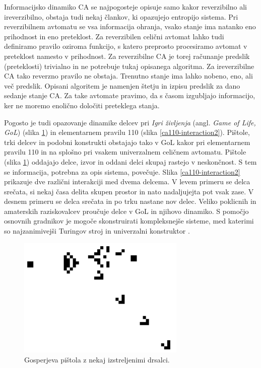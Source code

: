 \documentclass[12pt,a4paper,openany,twoside]{book}
\begin{document}
Informacijsko dinamiko CA se najpogosteje opisuje samo kakor reverzibilno ali ireverzibilno,
obstaja tudi nekaj člankov, ki opazujejo entropijo sistema.
Pri reverzibilnem avtomatu se vsa informacija ohranja, vsako stanje ima natanko eno prihodnost in eno preteklost.
Za reverzibilen celični avtomat lahko tudi definiramo pravilo oziroma funkcijo,
s katero preprosto procesiramo avtomat v preteklost namesto v prihodnost.
Za reverzibilne CA je torej računanje predslik (preteklosti)
trivialno in ne potrebuje tukaj opisanega algoritma.
Za ireverzibilne CA tako reverzno pravilo ne obstaja.
Trenutno stanje ima lahko nobeno, eno, ali več predslik.
Opisani algoritem je namenjen štetju in izpisu predslik za dano sedanje stanje CA.
Za take avtomate pravimo, da s časom izgubljajo informacijo,
ker ne moremo enolično določiti preteklega stanja.

Pogosto je tudi opazovanje dinamike delcev pri \emph{Igri življenja} (angl. \emph{Game of Life, GoL}) \cite{WikiGoL} (slika \ref{gospers_glider_gun})
in elementarnem pravilu 110 \cite{WikiRule110} (slika \ref{ca110-interaction2}).
Pištole, trki delcev in podobni konstrukti obstajajo tako v GoL kakor pri elementarnem pravilu 110
in na splošno pri vsakem univerzalnem celičnem avtomatu.
Pištole (slika \ref{gospers_glider_gun}) oddajajo delce, izvor in oddani delci skupaj rastejo v neskončnost.
S tem se informacija, potrebna za opis sistema, povečuje.
Slika \ref{ca110-interaction2} prikazuje dve različni interakciji med dvema delcema.
V levem primeru se delca srečata, si nekaj časa delita skupen prostor in nato nadaljujejta pot vsak zase.
V desnem primeru se delca srečata in po trku nastane nov delec.
Veliko poklicnih in amaterskih raziskovalcev proučuje delce v GoL in njihovo dinamiko.
S pomočjo osnovnih gradnikov je mogoče skonstruirati kompleksnejše sisteme, med katerimi so
najzanimivejši Turingov stroj \cite{Rendell2001} in univerzalni konstruktor \cite{Greene2013}.

\vspace{5mm}
\begin{figure}[htb]
\centerline{\includegraphics[width=8cm]{gospers_glider_gun}}
\caption[Gosperjeva pištola.]
{Gosperjeva pištola z nekaj izstreljenimi drsalci.}
\label{gospers_glider_gun}
\end{figure}
\end{document}
